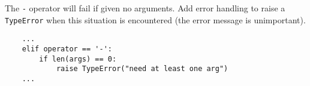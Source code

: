 \question The {\tt -} operator will fail if given no arguments. Add error
handling to raise a {\tt TypeError} when this situation is encountered (the
error message is unimportant).
\begin{solution}[2in]
\begin{lstlisting}
    ...
    elif operator == '-':
        if len(args) == 0:
            raise TypeError("need at least one arg")
    ...
\end{lstlisting}
\end{solution}

